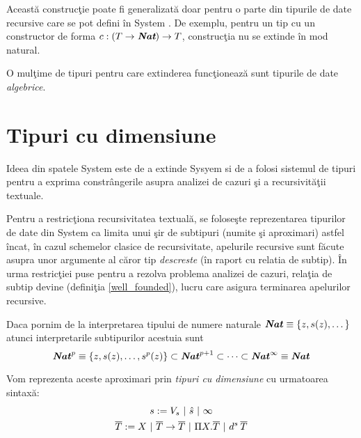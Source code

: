 \begin{remark}
Aceast\u a construc\c tie poate fi generalizat\u a doar pentru o parte din tipurile de date recursive care se pot defini \^ in System \frec. De exemplu, pentru un tip cu un constructor de forma $ c : (T \to \emph{\textbf{Nat}}) \to T$, construc\c tia nu se extinde \^ in mod natural.
\end{remark}

\begin{remark}
O mul\c time de tipuri pentru care extinderea func\c tioneaz\u a sunt tipurile de date \emph{algebrice}.
\end{remark}

\section{Tipuri cu dimensiune}

Ideea din spatele System \fhat \citep{1614481} este de a extinde Sysyem \frec si de a folosi sistemul de tipuri pentru a exprima constr\^ angerile asupra analizei de cazuri \c si a recursivit\u a\c tii textuale.

Pentru a restric\c tiona recursivitatea textual\u a, se folose\c ste reprezentarea tipurilor de date din System \frec ca limita unui \c sir de subtipuri (numite \c si aproximari) astfel \^ incat, \^ in cazul schemelor clasice de recursivitate, apelurile recursive sunt f\u acute asupra unor argumente al c\u aror tip \emph{des\-cres\-te} (\^ in raport cu relatia de subtip). \^ In urma restric\c tiei puse pentru a rezolva problema analizei de cazuri, rela\c tia de subtip devine  (defini\c tia \ref{well_founded}), lucru care asigura terminarea apelurilor recursive.

\begin{example}
Daca pornim de la interpretarea tipului de numere naturale $\textbf{\emph{Nat}} \equiv \{ z, s(z), \dots \}$ atunci interpretarile subtipurilor acestuia sunt
$$\textbf{\emph{Nat}}^p \equiv \{ z, s(z), \dots , s^p(z)\} \subset \textbf{\emph{Nat}}^{p+1} \subset \dots \subset \textbf{\emph{Nat}}^\infty \equiv \textbf{\emph{Nat}} $$
\end{example}

Vom reprezenta aceste aproximari prin \emph{tipuri cu dimensiune} cu urmatoarea sintax\u a:
\begin{gather*}
s := V_s \ |\ \hat{s}\ |\ \infty\\
\overline{T} := X \ |\ \overline{T} \to \overline{T}\ |\ \Pi X. \overline{T}\ |\ d^s\hspace{2pt} \overline{T}
\end{gather*}

